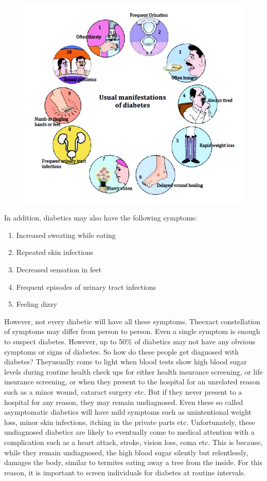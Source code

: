\begin{figure}[h]
\centering
\includegraphics[scale=2.3]{images/023.jpg}
\end{figure}

In addition, diabetics may also have the following symptoms:

\begin{enumerate}[\ding{226}]
\itemsep=0pt
\item Increased sweating while eating
\item Repeated skin infections
\item Decreased sensation in feet
\item Frequent episodes of urinary tract infections
\item Feeling dizzy
 \end{enumerate}

However, not every diabetic will have all these symptoms. The\break exact constellation of symptoms may differ from person to person. Even a single symptom is enough to suspect diabetes. However, up to 50\% of diabetics may not have any obvious symptoms or signs of diabetes. So how do these people get diagnosed with diabetes? They\break usually come to light when blood tests show high blood sugar levels during routine health check ups for either health insurance scree\-ning, or life insurance screening, or when they present to the hospital for an un\-related reason such as a minor wound, cataract surgery etc. But if they never present to a hospital for any reason, they may remain undia\-gnosed. Even these so called asymptomatic diabetics will have mild symptoms such as unintentional weight loss, minor skin infections, itching in the private parts etc. Unfortunately, these undiagno\-sed dia\-betics are likely to eventually come to medical attention with a compli\-cation such as a heart attack, stroke, vision loss, coma etc. This is because, while they remain undiagnosed, the high blood sugar silently but relentlessly, damages the body, similar to termites eating away a tree from the inside. For this reason, it is important to screen indi\-viduals for diabetes at routine intervals.

